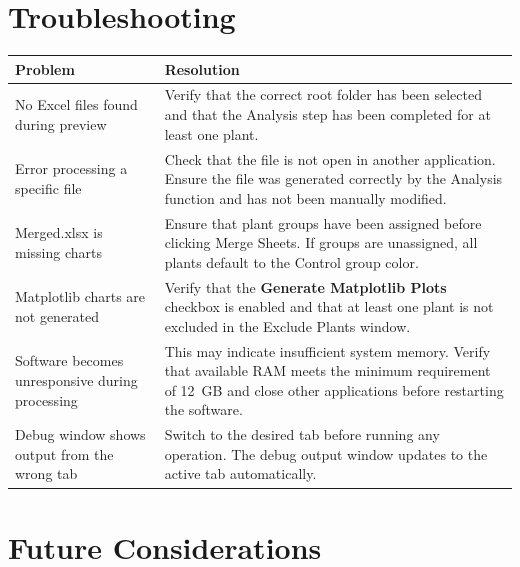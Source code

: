 \documentclass[12pt,a4paper,oneside]{report}
\begin{document}
\cleardoublepage

\chapter{Troubleshooting}

\begin{table}[H]
    \centering
    \begin{tabular}{p{5.5cm} p{8cm}}
        \toprule
        \textbf{Problem} & \textbf{Resolution} \\
        \midrule
        No Excel files found during preview & Verify that the correct root folder has been selected and that the Analysis step has been completed for at least one plant. \\
        \addlinespace
        Error processing a specific file & Check that  the file is not open in another application. Ensure the file was generated correctly by the Analysis function and has not been manually modified. \\
        \addlinespace
        Merged.xlsx is missing charts & Ensure that plant groups have been assigned before clicking Merge Sheets. If groups are unassigned, all plants default to the Control group color. \\
        \addlinespace
        Matplotlib charts are not generated & Verify that the \textbf{Generate Matplotlib Plots} checkbox is enabled and that at least one plant is not excluded in the Exclude Plants window. \\
        \addlinespace
        Software becomes unresponsive during processing & This may indicate insufficient system memory. Verify that available RAM meets the minimum requirement of 12~GB and close other applications before restarting the software. \\
        \addlinespace
        Debug window shows output from the wrong tab & Switch to the desired tab before running any operation. The debug output window updates to the active tab automatically. \\
        \bottomrule
    \end{tabular}
\end{table}

\chapter{Future Considerations}
\end{document}
